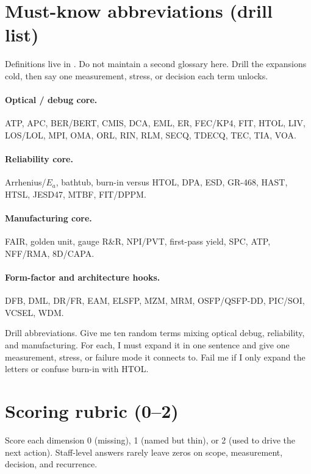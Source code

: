 \section{Must-know abbreviations (drill list)}
\label{sec:interview-abbrev-drill}

Definitions live in . Do not maintain a second glossary
here. Drill the expansions cold, then say one measurement, stress, or decision
each term unlocks.

\paragraph{Optical / debug core.}
ATP, APC, BER/BERT, CMIS, DCA, EML, ER, FEC/KP4, FIT, HTOL, LIV, LOS/LOL, MPI,
OMA, ORL, RIN, RLM, SECQ, TDECQ, TEC, TIA, VOA.

\paragraph{Reliability core.}
Arrhenius/$E_a$, bathtub, burn-in versus HTOL, DPA, ESD, GR-468, HAST, HTSL,
JESD47, MTBF, FIT/DPPM.

\paragraph{Manufacturing core.}
FAIR, golden unit, gauge R\&R, NPI/PVT, first-pass yield, SPC, ATP, NFF/RMA,
8D/CAPA.

\paragraph{Form-factor and architecture hooks.}
DFB, DML, DR/FR, EAM, ELSFP, MZM, MRM, OSFP/QSFP-DD, PIC/SOI, VCSEL, WDM.

{Drill abbreviations. Give me ten random terms mixing optical debug,
reliability, and manufacturing. For each, I must expand it in one sentence and
give one measurement, stress, or failure mode it connects to. Fail me if I only
expand the letters or confuse burn-in with HTOL.}

\section{Scoring rubric (0--2)}
\label{sec:interview-scoring-rubric}

Score each dimension 0 (missing), 1 (named but thin), or 2 (used to drive the
next action). Staff-level answers rarely leave zeros on scope, measurement,
decision, and recurrence.

